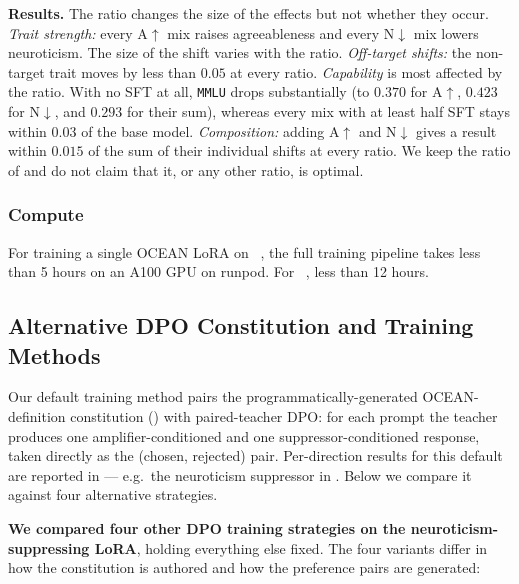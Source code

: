 \textbf{Results.} The ratio changes the size of the effects but not whether
they occur. \emph{Trait strength:} every A$\uparrow$ mix raises agreeableness
and every N$\downarrow$ mix lowers neuroticism. The size of the shift varies
with the ratio. \emph{Off-target shifts:} the non-target trait moves
by less than $0.05$ at every ratio. \emph{Capability} is most affected by the
ratio. With no SFT at all, \texttt{MMLU} drops substantially (to $0.370$
for A$\uparrow$, $0.423$ for N$\downarrow$, and $0.293$ for their sum), whereas
every mix with at least half SFT stays within $0.03$ of the base model.
\emph{Composition:} adding A$\uparrow$ and N$\downarrow$ gives a result within
$0.015$ of the sum of their individual shifts at every ratio. We keep the ratio of
\citet{maiya2025opencharacter} and do not claim that it, or any other ratio, is
optimal.

\subsubsection{Compute}
For training a single OCEAN LoRA on \LlamaThreePointOneSizeEightBInstruct~\citep{grattafiori2024llama}, the full training pipeline takes less than 5 hours on an A100 GPU on runpod. For \GemmaThreeSizeTwentySevenBIT~\citep{gemma_2025}, less than 12 hours.


\subsection{Alternative DPO Constitution and Training Methods}\label{sec:appendix-b-dpo-methods}

Our default training method pairs the programmatically-generated OCEAN-definition constitution () with paired-teacher DPO: for each prompt the teacher produces one amplifier-conditioned and one suppressor-conditioned response, taken directly as the (chosen, rejected) pair. Per-direction results for this default are reported in  --- e.g.\ the neuroticism suppressor in . Below we compare it against four alternative strategies.

\textbf{We compared four other DPO training strategies on the neuroticism-suppressing LoRA}, holding everything else fixed. The four variants differ in how the constitution is authored and how the preference pairs are generated:

